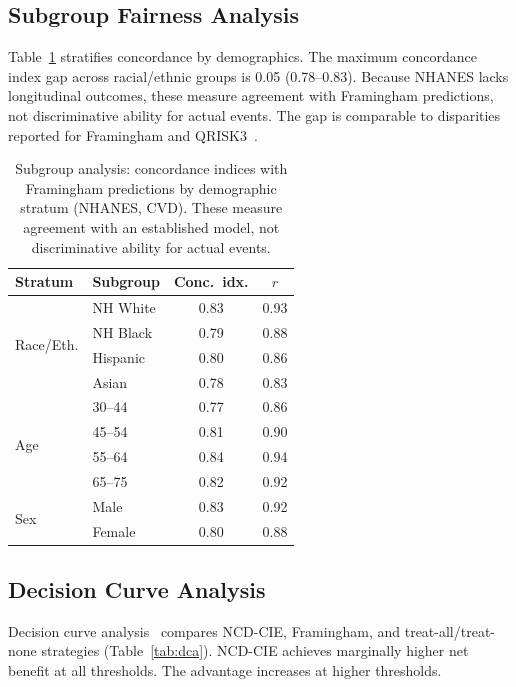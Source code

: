 \documentclass[runningheads]{llncs}
\begin{document}
\subsection{Subgroup Fairness Analysis}\label{sec:subgroup}

Table~\ref{tab:subgroup} stratifies concordance by demographics.
The maximum concordance index gap across racial/ethnic groups is 0.05
(0.78--0.83).
Because NHANES lacks longitudinal outcomes, these measure agreement
with Framingham predictions, not discriminative ability for actual
events. The gap is comparable to disparities reported for Framingham and
QRISK3~\cite{hippisley2017qrisk3}.

\renewcommand{\arraystretch}{1.2}
\begin{table}[t]
\centering
\caption{Subgroup analysis: concordance indices with Framingham
predictions by demographic stratum (NHANES, CVD).
These measure agreement with an established model, not
discriminative ability for actual events.}
\label{tab:subgroup}
\small
\begin{tabular}{@{}llcc@{}}
\toprule
\textbf{Stratum} & \textbf{Subgroup} & \textbf{Conc.\ idx.} & \textbf{$r$} \\
\midrule
\multirow{4}{*}{Race/Eth.}
  & NH White  & 0.83 & 0.93 \\
  & NH Black  & 0.79 & 0.88 \\
  & Hispanic  & 0.80 & 0.86 \\
  & Asian     & 0.78 & 0.83 \\
\midrule
\multirow{4}{*}{Age}
  & 30--44    & 0.77 & 0.86 \\
  & 45--54    & 0.81 & 0.90 \\
  & 55--64    & 0.84 & 0.94 \\
  & 65--75    & 0.82 & 0.92 \\
\midrule
\multirow{2}{*}{Sex}
  & Male      & 0.83 & 0.92 \\
  & Female    & 0.80 & 0.88 \\
\bottomrule
\end{tabular}
\end{table}
\renewcommand{\arraystretch}{1.0}

\subsection{Decision Curve Analysis}\label{sec:dca}

Decision curve analysis~\cite{vickers2006dca} compares NCD-CIE,
Framingham, and treat-all/treat-none strategies
(Table~\ref{tab:dca}).
NCD-CIE achieves marginally higher net benefit at all thresholds.
The advantage increases at higher thresholds.
\end{document}
